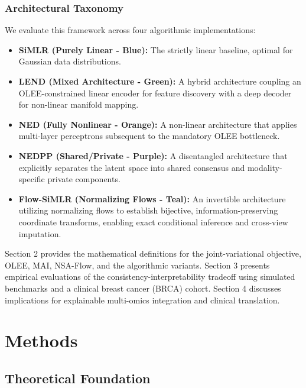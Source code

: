 \documentclass[
  letterpaper,
]{report}
\providecommand{\tightlist}{%
  \setlength{\itemsep}{0pt}\setlength{\parskip}{0pt}}
\begin{document}
\subsection{Architectural Taxonomy}\label{architectural-taxonomy}

We evaluate this framework across four algorithmic implementations:

\begin{itemize}
\tightlist
\item
  {\textbf{SiMLR (Purely Linear - Blue):}} The strictly linear baseline,
  optimal for Gaussian data distributions.
\item
  {\textbf{LEND (Mixed Architecture - Green):}} A hybrid architecture
  coupling an OLEE-constrained linear encoder for feature discovery with
  a deep decoder for non-linear manifold mapping.
\item
  {\textbf{NED (Fully Nonlinear - Orange):}} A non-linear architecture
  that applies multi-layer perceptrons subsequent to the mandatory OLEE
  bottleneck.
\item
  {\textbf{NEDPP (Shared/Private - Purple):}} A disentangled
  architecture that explicitly separates the latent space into shared
  consensus and modality-specific private components.
\item
  {\textbf{Flow-SiMLR (Normalizing Flows - Teal):}} An invertible
  architecture utilizing normalizing flows to establish bijective,
  information-preserving coordinate transforms, enabling exact
  conditional inference and cross-view imputation.
\end{itemize}

Section 2 provides the mathematical definitions for the
joint-variational objective, OLEE, MAI, NSA-Flow, and the algorithmic
variants. Section 3 presents empirical evaluations of the
consistency-interpretability tradeoff using simulated benchmarks and a
clinical breast cancer (BRCA) cohort. Section 4 discusses implications
for explainable multi-omics integration and clinical translation.


\chapter{Methods}\label{methods}

\section{Theoretical Foundation}\label{theoretical-foundation}
\end{document}
